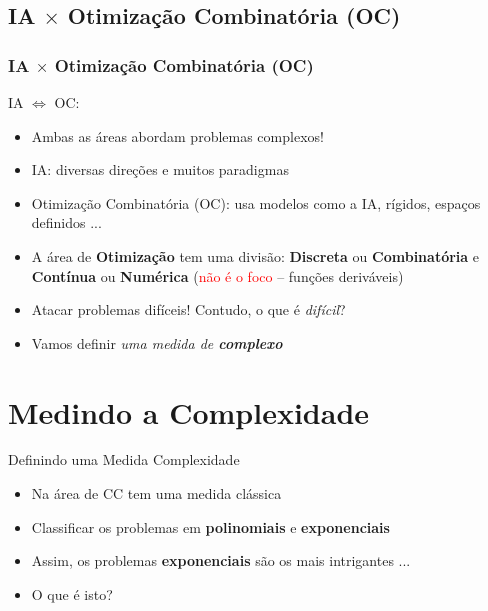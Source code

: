 \documentclass{beamer}
\begin{document}

\subsection{IA $\times $ Otimização Combinatória (OC)}

\begin{frame}[fragile]
\frametitle{IA $\times $ Otimização Combinatória (OC)}

\begin{block}{IA $\Leftrightarrow $ OC:}
  \begin{itemize}
   \item  Ambas as áreas abordam problemas complexos!

    \item IA: diversas direções e muitos paradigmas

    \item Otimização Combinatória (OC): usa modelos como a IA, rígidos, espaços definidos ...
    
        \item A área de \textbf{Otimização} tem uma divisão: \textbf{Discreta} ou \textbf{Combinatória} e 
        \textbf{Contínua} ou \textbf{Numérica} (\textcolor{red}{não é o foco} -- funções deriváveis)
        
        \item  Atacar problemas difíceis! Contudo, o que é \textit{difícil}?
        
                
       \item   Vamos definir \textit{uma medida de \textbf{complexo}}
    \end{itemize}
  
  \end{block}

\end{frame}



\section{Medindo a Complexidade}

\begin{frame}
\begin{block}{Definindo uma Medida Complexidade}
  \begin{itemize}
 
  \item Na área de CC tem uma medida clássica
  \item Classificar os problemas em \textbf{polinomiais} e \textbf{exponenciais}
     
     \item Assim, os problemas  \textbf{exponenciais} são os mais intrigantes ...
     \item O que é isto?
  \end{itemize}
\end{block}
\end{frame}
\end{document}
